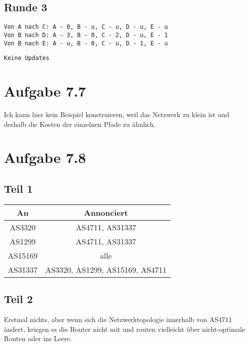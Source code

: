 \documentclass[10pt,a4paper]{article}
\begin{document}
\subsection{Runde 3}

\begin{verbatim}
Von A nach C: A - 0, B - u, C - u, D - u, E - u
Von B nach D: A - 3, B - 0, C - 2, D - u, E - 1
Von B nach E: A - u, B - 0, C - u, D - 1, E - u
\end{verbatim}

\begin{verbatim}
Keine Updates
\end{verbatim}

\section{Aufgabe 7.7}

Ich kann hier kein Beispiel konstruieren, weil das Netzwerk zu klein ist und
deshalb die Kosten der einzelnen Pfade zu ähnlich.

\section{Aufgabe 7.8}

\subsection{Teil 1}

\begin{tabular}{c|c}
  An & Annonciert\\\hline
  AS3320 & AS4711, AS31337\\
  AS1299 & AS4711, AS31337\\
  AS15169 & alle\\
  AS31337 & AS3320, AS1299, AS15169, AS4711
\end{tabular}

\subsection{Teil 2}

Erstmal nichts, aber wenn sich die Netzwerktopologie innerhalb von AS4711
ändert, kriegen es die Router nicht mit und routen vielleicht über
nicht-optimale Routen oder ins Leere.
\end{document}
